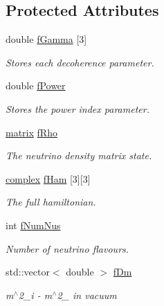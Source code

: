 \subsection*{Protected Attributes}
\begin{DoxyCompactItemize}
\item 
double \hyperlink{classOscProb_1_1PMNS__Deco_ae2f30ac9f8b25344959f1698616d337a}{f\+Gamma} \mbox{[}3\mbox{]}
\begin{DoxyCompactList}\small\item\em Stores each decoherence parameter. \end{DoxyCompactList}\item 
double \hyperlink{classOscProb_1_1PMNS__Deco_a19fdcdf9a8b2bd9677f72ca1fd77dc3e}{f\+Power}
\begin{DoxyCompactList}\small\item\em Stores the power index parameter. \end{DoxyCompactList}\item 
\hyperlink{classOscProb_1_1PMNS__Deco_a77b4e0c041b6268910a270be0f5387c9}{matrix} \hyperlink{classOscProb_1_1PMNS__Deco_a0488d62b4ef4cf5b43425769f5fcdbdf}{f\+Rho}
\begin{DoxyCompactList}\small\item\em The neutrino density matrix state. \end{DoxyCompactList}\item 
\hyperlink{classOscProb_1_1PMNS__Base_ae86ec4718808ce9d02e5f5b4226714ab}{complex} \hyperlink{classOscProb_1_1PMNS__Fast_aab37f2a7f59ab7026a8a21a561115dd0}{f\+Ham} \mbox{[}3\mbox{]}\mbox{[}3\mbox{]}
\begin{DoxyCompactList}\small\item\em The full hamiltonian. \end{DoxyCompactList}\item 
int \hyperlink{classOscProb_1_1PMNS__Base_a24bb74bed63569dfe88b18fa6a08060e}{f\+Num\+Nus}
\begin{DoxyCompactList}\small\item\em Number of neutrino flavours. \end{DoxyCompactList}\item 
std\+::vector$<$ double $>$ \hyperlink{classOscProb_1_1PMNS__Base_a406a31c3b5d620e5a0cace5b411f9f70}{f\+Dm}
\begin{DoxyCompactList}\small\item\em m$^\wedge$2\+\_\+i -\/ m$^\wedge$2\+\_ in vacuum \end{DoxyCompactList}\item 

\end{DoxyCompactItemize}
